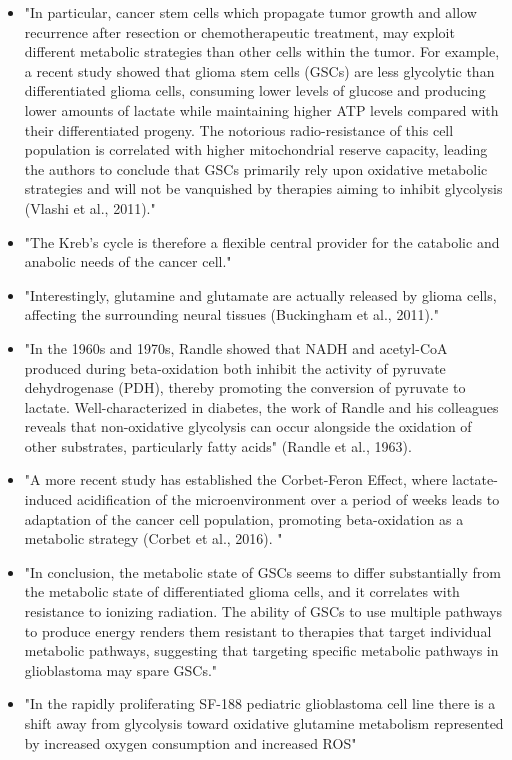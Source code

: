 \documentclass[11pt,a4paper]{article}
\begin{document}
\begin{itemize}
\item "In particular, cancer stem cells which propagate tumor growth and allow recurrence after resection or chemotherapeutic treatment, may exploit different metabolic strategies than other cells within the tumor. For example, a recent study showed that glioma stem cells (GSCs) are less glycolytic than differentiated glioma cells, consuming lower levels of glucose and producing lower amounts of lactate while maintaining higher ATP levels compared with their differentiated progeny. The notorious radio-resistance of this cell population is correlated with higher mitochondrial reserve capacity, leading the authors to conclude that GSCs primarily rely upon oxidative metabolic strategies and will not be vanquished by therapies aiming to inhibit glycolysis (Vlashi et al., 2011)."\cite{Strickland2017}
\item "The Kreb's cycle is therefore a flexible central provider for the catabolic and anabolic needs of the cancer cell." \cite{Strickland2017}
\item "Interestingly, glutamine and glutamate are actually released by glioma cells, affecting the surrounding neural tissues (Buckingham et al., 2011)."\cite{Strickland2017}
\item "In the 1960s and 1970s, Randle showed that NADH and acetyl-CoA produced during beta-oxidation both inhibit the activity of pyruvate dehydrogenase (PDH), thereby promoting the conversion of pyruvate to lactate. Well-characterized in diabetes, the work of Randle and his colleagues reveals that non-oxidative glycolysis can occur alongside the oxidation of other substrates, particularly fatty acids" (Randle et al., 1963).\cite{Strickland2017}
\item "A more recent study has established the Corbet-Feron Effect, where lactate-induced acidification of the microenvironment over a period of weeks leads to adaptation of the cancer cell population, promoting beta-oxidation as a metabolic strategy (Corbet et al., 2016). "\cite{Strickland2017}
\item "In conclusion, the metabolic state of GSCs seems to differ substantially from the metabolic state of differentiated glioma cells, and it correlates with resistance to ionizing radiation. The ability of GSCs to use multiple pathways to produce energy renders them resistant to therapies that target individual metabolic pathways, suggesting that targeting specific metabolic pathways in glioblastoma may spare GSCs."\cite{Vlashi2011}
\item "In the rapidly proliferating SF-188 pediatric glioblastoma cell line there is a shift away from glycolysis toward oxidative glutamine metabolism represented by increased oxygen consumption and increased ROS"\cite{Strickland2017}

\end{itemize}
\end{document}
